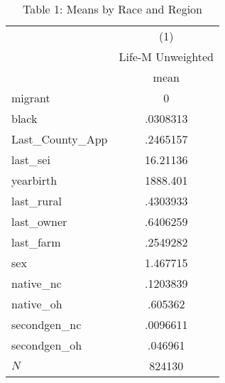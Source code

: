 \begin{table}[htbp]\centering
\def\sym#1{\ifmmode^{#1}\else\(^{#1}\)\fi}
\caption{Table 1: Means by Race and Region}
\begin{tabular}{l*{1}{c}}
\hline\hline
            &\multicolumn{1}{c}{(1)}\\
            &\multicolumn{1}{c}{Life-M Unweighted}\\
            &        mean\\
\hline
migrant     &           0\\
black       &    .0308313\\
Last\_County\_App&    .2465157\\
last\_sei    &    16.21136\\
yearbirth   &    1888.401\\
last\_rural  &    .4303933\\
last\_owner  &    .6406259\\
last\_farm   &    .2549282\\
sex         &    1.467715\\
native\_nc   &    .1203839\\
native\_oh   &     .605362\\
secondgen\_nc&    .0096611\\
secondgen\_oh&     .046961\\
\hline
\(N\)       &      824130\\
\hline\hline
\end{tabular}
\end{table}
